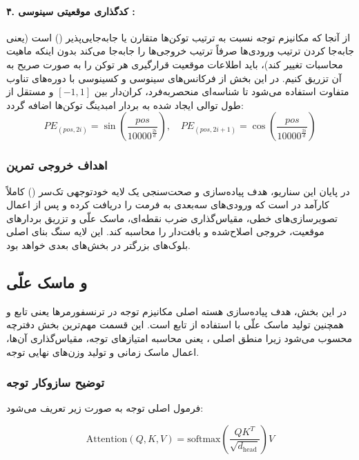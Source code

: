 \documentclass{article}
\begin{document}
\paragraph{۴. کدگذاری موقعیتی سینوسی :}
از آنجا که مکانیزم توجه نسبت به ترتیب توکن‌ها متقارن یا جابه‌جایی‌پذیر () است (یعنی جابه‌جا کردن ترتیب ورودی‌ها صرفاً ترتیب خروجی‌ها را جابه‌جا می‌کند بدون اینکه ماهیت محاسبات تغییر کند)، باید اطلاعات موقعیت قرارگیری هر توکن را به صورت صریح به آن تزریق کنیم. در این بخش از فرکانس‌های سینوسی و کسینوسی با دوره‌های تناوب متفاوت استفاده می‌شود تا شناسه‌ای منحصربه‌فرد، کران‌دار بین $[-1, 1]$ و مستقل از طول توالی ایجاد شده به بردار امبدینگ توکن‌ها اضافه گردد:
\[
PE_{(pos, 2i)} = \sin\left(\frac{pos}{10000^{\frac{2i}{d}}}\right), \quad PE_{(pos, 2i+1)} = \cos\left(\frac{pos}{10000^{\frac{2i}{d}}}\right)
\]

\subsubsection*{اهداف خروجی تمرین}
در پایان این سناریو، هدف پیاده‌سازی و صحت‌سنجی یک لایه خود‌توجهی تک‌سر () کاملاً کارآمد در  است که ورودی‌های سه‌بعدی به فرمت  را دریافت کرده و پس از اعمال تصویرسازی‌های خطی، مقیاس‌گذاری ضرب نقطه‌ای، ماسک علّی و تزریق بردارهای موقعیت، خروجی اصلاح‌شده و بافت‌دار را محاسبه کند. این لایه سنگ بنای اصلی بلوک‌های  بزرگتر در بخش‌های بعدی خواهد بود.


\subsection{ و ماسک علّی}

در این بخش، هدف پیاده‌سازی هسته اصلی مکانیزم توجه در ترنسفورمرها یعنی تابع  و همچنین تولید ماسک علّی با استفاده از تابع  است. این قسمت مهم‌ترین بخش دفترچه محسوب می‌شود زیرا منطق اصلی ، یعنی محاسبه امتیازهای توجه، مقیاس‌گذاری آن‌ها، اعمال ماسک زمانی و تولید وزن‌های نهایی توجه.

\subsubsection*{توضیح سازوکار توجه}

فرمول اصلی توجه به صورت زیر تعریف می‌شود:

\[
\mathrm{Attention}(Q,K,V) = \mathrm{softmax}\left( \frac{QK^T}{\sqrt{d_{\mathrm{head}}}} \right) V
\]
\end{document}
